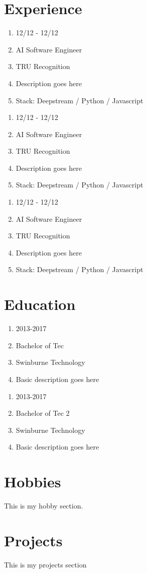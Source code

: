 \documentclass[10pt]{article}
\begin{document}
\section{Experience}
\begin{enumerate}
	\item 12/12 - 12/12
	\item AI Software Engineer
	\item TRU Recognition
	\item Description goes here
	\item Stack: Deepstream / Python / Javascript
\end{enumerate}
\begin{enumerate}
	\item 12/12 - 12/12
	\item AI Software Engineer
	\item TRU Recognition
	\item Description goes here
	\item Stack: Deepstream / Python / Javascript
\end{enumerate}
\begin{enumerate}
	\item 12/12 - 12/12
	\item AI Software Engineer
	\item TRU Recognition
	\item Description goes here
	\item Stack: Deepstream / Python / Javascript
\end{enumerate}

\section{Education}
\begin{enumerate}
	\item 2013-2017
	\item Bachelor of Tec
	\item Swinburne Technology
	\item Basic description goes here
\end{enumerate}
\begin{enumerate}
	\item 2013-2017
	\item Bachelor of Tec 2
	\item Swinburne Technology
	\item Basic description goes here
\end{enumerate}

\section{Hobbies}
This is my hobby section.

\section{Projects}
This is my projects section
\end{document}
